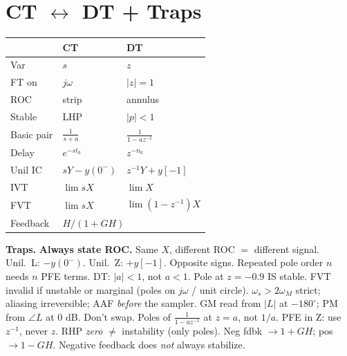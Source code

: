 \documentclass[11pt]{extarticle}
\begin{document}
\section*{CT $\leftrightarrow$ DT + Traps}

\begin{table}
  \begin{tabular}{@{}l l l@{}}
    \toprule
     & CT & DT \\
    \midrule
    Var & $s$ & $z$ \\
    FT on & $j\omega$ & $|z|{=}1$ \\
    ROC & strip & annulus \\
    Stable & LHP & $|p|{<}1$ \\
    Basic pair & $\tfrac{1}{s+a}$ & $\tfrac{1}{1-az^{-1}}$ \\
    Delay & $e^{-st_0}$ & $z^{-n_0}$ \\
    Unil IC & $sY{-}y(0^-)$ & $z^{-1}Y{+}y[-1]$ \\
    IVT & $\lim sX$ & $\lim X$ \\
    FVT & $\lim sX$ & $\lim(1{-}z^{-1})X$ \\
    Feedback & \multicolumn{2}{l}{$H/(1{+}GH)$} \\
    \bottomrule
  \end{tabular}
\end{table}
\textbf{Traps.}
\textbf{Always state ROC.} Same $X$, different ROC $=$ different signal.
Unil.\ L: $\mathbf{-}y(0^-)$. Unil.\ Z: $\mathbf{+}y[-1]$. Opposite signs.
Repeated pole order $n$ needs $n$ PFE terms.
DT: $|a|<1$, not $a<1$. Pole at $z=-0.9$ IS stable.
FVT invalid if unstable or marginal (poles on $j\omega$ / unit circle).
$\omega_s>2\omega_M$ strict; aliasing irreversible; AAF \emph{before} the sampler.
GM read from $|L|$ at $-180^\circ$; PM from $\angle L$ at 0 dB. Don't swap.
Poles of $\tfrac{1}{1-az^{-1}}$ at $z=a$, not $1/a$.
PFE in Z: use $z^{-1}$, never $z$.
RHP \emph{zero} $\ne$ instability (only poles).
Neg fdbk $\to 1+GH$; pos $\to 1-GH$.
Negative feedback does \emph{not} always stabilize.
\end{document}
